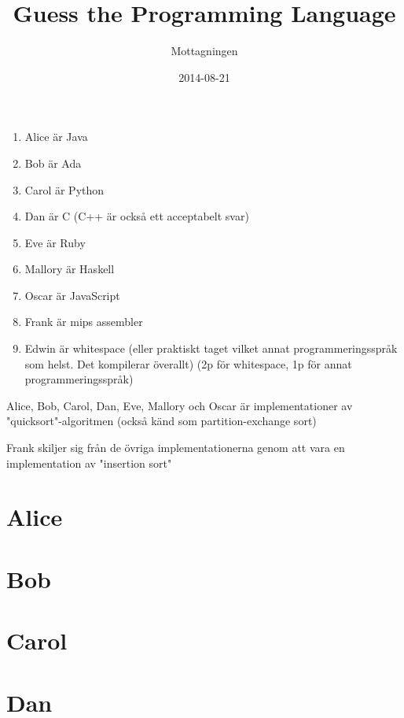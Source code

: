 \documentclass[a4paper]{scrreprt}
\title{Guess the Programming Language}
\subtitle{}
\author{Mottagningen}
\date{2014-08-21}
\begin{document}
\begin{enumerate}
\item Alice är Java
\item Bob är Ada
\item Carol är Python
\item Dan är C (C++ är också ett acceptabelt svar)
\item Eve är Ruby
\item Mallory är Haskell
\item Oscar är JavaScript
\item Frank är mips assembler
\item Edwin är whitespace (eller praktiskt taget vilket annat programmeringsspråk som helst. Det kompilerar överallt) (2p för whitespace, 1p för annat programmeringsspråk) 
\end{enumerate}

Alice, Bob, Carol, Dan, Eve, Mallory och Oscar är implementationer av "quicksort"-algoritmen (också känd som partition-exchange sort)

Frank skiljer sig från de övriga implementationerna genom att vara en implementation av "insertion sort"

\maketitle

\chapter{Alice}



\chapter{Bob}



\chapter{Carol}



\chapter{Dan}


\end{document}
